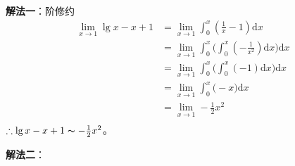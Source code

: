 \textbf{解法一}：阶修约
\begin{equation}
\begin{aligned}
    \lim_{x \to 1} \lg{x} - x + 1
    & = \lim_{x \to 1} \int_{0}^{x}{(\frac{1}{x} - 1) \mathrm{d}x} \\
    & = \lim_{x \to 1} \int_{0}^{x}\Big({ \int_{0}^{x}{(- \frac{1}{x^2}) \mathrm{d} x}\Big)\mathrm{d}x} \\
    & = \lim_{x \to 1} \int_{0}^{x}\Big({ \int_{0}^{x}{(-1)\mathrm{d}x} \Big)\mathrm{d}x} \\
    & = \lim_{x \to 1}\int_{0}^{x}{\Big( -x \Big) \mathrm{d}x} \\
    & = \lim_{x \to 1} - \frac{1}{2} x^2 \\
\end{aligned}
\end{equation}
$ \therefore \lg{x} - x + 1 \thicksim - \frac{1}{2} x^2 $。

\textbf{解法二}：